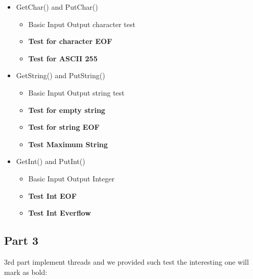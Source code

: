 \documentclass[a4paper,10pt]{article}
\begin{document}
\begin{itemize}
	\item GetChar() and PutChar()
		\begin{itemize}
		\item Basic Input Output character test
		\item {\bf Test for character EOF}
		\item {\bf Test for ASCII 255}
		\end{itemize}
	\item GetString() and PutString()
		\begin{itemize}
		\item Basic Input Output string test
		\item {\bf Test for empty string}
		\item {\bf Test for string EOF}
		\item {\bf Test Maximum String}
		\end{itemize}
	\item GetInt() and PutInt()
		\begin{itemize}
		\item Basic Input Output Integer
		\item {\bf Test Int EOF}
		\item {\bf Test Int Everflow}
		\end{itemize}
\end{itemize} 

\subsection{Part 3}

3rd part implement threads and we provided such test the interesting one will mark as bold: 
\end{document}
